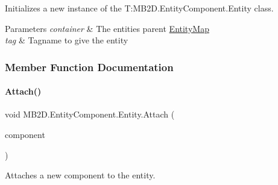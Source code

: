 Initializes a new instance of the T\+:\+M\+B2\+D.\+Entity\+Component.\+Entity class. 


\begin{DoxyParams}{Parameters}
{\em container} & The entities parent \hyperlink{class_m_b2_d_1_1_entity_component_1_1_entity_map}{Entity\+Map}\\
\hline
{\em tag} & Tagname to give the entity\\
\hline
\end{DoxyParams}


\subsubsection{Member Function Documentation}
\hypertarget{class_m_b2_d_1_1_entity_component_1_1_entity_aa86d1be62df6d89b981d1000c856a306}{}\label{class_m_b2_d_1_1_entity_component_1_1_entity_aa86d1be62df6d89b981d1000c856a306} 
\paragraph{\texorpdfstring{Attach()}{Attach()}}
{\footnotesize\ttfamily void M\+B2\+D.\+Entity\+Component.\+Entity.\+Attach (\begin{DoxyParamCaption}\item[{\hyperlink{interface_m_b2_d_1_1_entity_component_1_1_i_component}{I\+Component}}]{component }\end{DoxyParamCaption})\hspace{0.3cm}{\ttfamily [inline]}}



Attaches a new component to the entity. 


